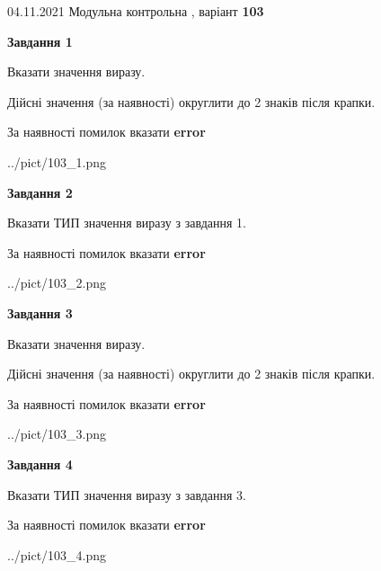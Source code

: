 \documentclass[11pt, ukrainian]{article}
\begin{document}
{04.11.2021 Модульна контрольна , варіант  \No \textbf { 103 }\par}
{
\begin {large}
{\begin {center}\textbf{Завдання 1}\end {center}}\par
Вказати значення виразу. \par
Дійсні значення (за наявності) округлити до 2 знаків після крапки. \par
За наявності помилок вказати \textbf{error}

\begin{center}
	{../pict/103_1.png}
\end{center}
\newpage

{\begin {center}\textbf{Завдання 2}\end {center}}\par
Вказати ТИП значення виразу з завдання 1. \par
За наявності помилок вказати \textbf{error}

\begin{center}
	{../pict/103_2.png}
\end{center}
\newpage

{\begin {center}\textbf{Завдання 3}\end {center}}\par
Вказати значення виразу. \par
Дійсні значення (за наявності) округлити до 2 знаків після крапки. \par
За наявності помилок вказати \textbf{error}

\begin{center}
	{../pict/103_3.png}
\end{center}
\newpage

{\begin {center}\textbf{Завдання 4}\end {center}}\par
Вказати ТИП значення виразу з завдання 3. \par
За наявності помилок вказати \textbf{error}

\begin{center}
	{../pict/103_4.png}
\end{center}
\newpage


\end{large}}
\end{document}
